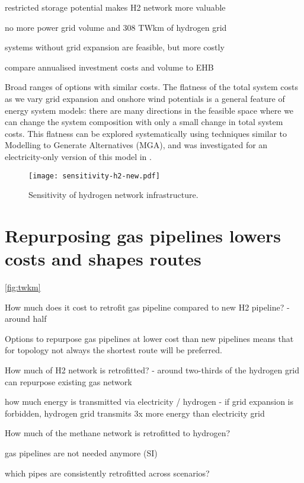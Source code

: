 restricted storage potential makes H2 network more valuable

no more power grid volume and 308 TWkm of hydrogen grid

systems without grid expansion are feasible, but more costly

compare annualised investment costs and volume to EHB

Broad ranges of options with similar costs. The flatness of the total system
costs as we vary grid expansion and onshore wind potentials is a general feature
of energy system models: there are many directions in the feasible space where
we can change the system composition with only a small change in total system
costs. This flatness can be explored systematically using techniques similar to
Modelling to Generate Alternatives (MGA), and was investigated for an
electricity-only version of this model in \cite{Neumann2019}.

\begin{SCfigure}
    \centering
    \texttt{[image: sensitivity-h2-new.pdf]}
    \caption{Sensitivity of hydrogen network infrastructure.}
    \label{fig:sensitivity-h2}
\end{SCfigure}


\section*{Repurposing gas pipelines lowers costs and shapes routes}
\label{sec:repurposed}

\cref{fig:twkm}

How much does it cost to retrofit gas pipeline compared to new H2 pipeline?
- around half

Options to repurpose gas pipelines at lower cost than new pipelines means that
for topology not always the shortest route will be preferred.

How much of H2 network is retrofitted?
- around two-thirds of the hydrogen grid can repurpose existing gas network

how much energy is transmitted via electricity / hydrogen
- if grid expansion is forbidden, hydrogen grid transmits 3x more energy than electricity grid

How much of the methane network is retrofitted to hydrogen?

gas pipelines are not needed anymore (SI)

which pipes are consistently retrofitted across scenarios?

